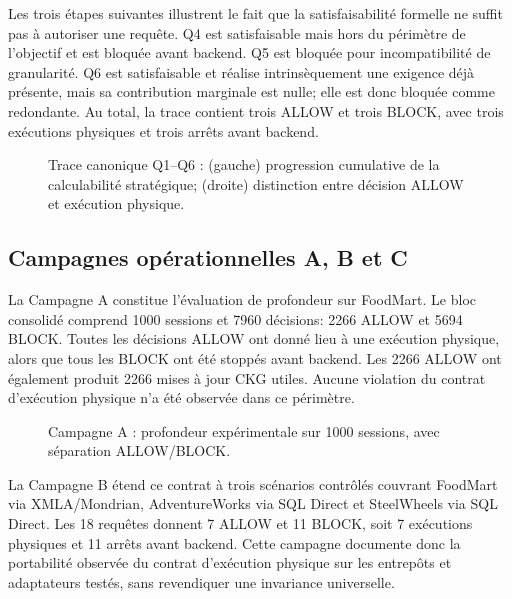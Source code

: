 Les trois étapes suivantes illustrent le fait que la satisfaisabilité
formelle ne suffit pas à autoriser une requête. Q4 est satisfaisable
mais hors du périmètre de l'objectif et est bloquée avant backend. Q5
est bloquée pour incompatibilité de granularité. Q6 est satisfaisable
et réalise intrinsèquement une exigence déjà présente, mais sa
contribution marginale est nulle; elle est donc bloquée comme
redondante. Au total, la trace contient trois ALLOW et trois BLOCK,
avec trois exécutions physiques et trois arrêts avant backend.

\begin{figure}[!t]
\centering
\begin{minipage}[t]{0.49\textwidth}
\centering

\end{minipage}\hfill
\begin{minipage}[t]{0.49\textwidth}
\centering

\end{minipage}
\caption{Trace canonique Q1--Q6 : (gauche) progression cumulative de la calculabilité stratégique; (droite) distinction entre décision ALLOW et exécution physique.}
\label{fig:v4-q1-q6}
\end{figure}


\subsection{Campagnes opérationnelles A, B et C}

La Campagne A constitue l'évaluation de profondeur sur FoodMart. Le
bloc consolidé comprend 1000 sessions et 7960 décisions: 2266 ALLOW
et 5694 BLOCK. Toutes les décisions ALLOW ont donné lieu à une
exécution physique, alors que tous les BLOCK ont été stoppés avant
backend. Les 2266 ALLOW ont également produit 2266 mises à jour CKG
utiles. Aucune violation du contrat d'exécution physique n'a été
observée dans ce périmètre.

\begin{figure}[!t]
\centering

\caption{Campagne A : profondeur expérimentale sur 1000 sessions, avec séparation ALLOW/BLOCK.}
\label{fig:v4-campaign-a}
\end{figure}


La Campagne B étend ce contrat à trois scénarios contrôlés couvrant
FoodMart via XMLA/Mondrian, AdventureWorks via SQL Direct et
SteelWheels via SQL Direct. Les 18 requêtes donnent 7 ALLOW et
11 BLOCK, soit 7 exécutions physiques et 11 arrêts avant backend.
Cette campagne documente donc la portabilité observée du contrat
d'exécution physique sur les entrepôts et adaptateurs testés, sans
revendiquer une invariance universelle.

